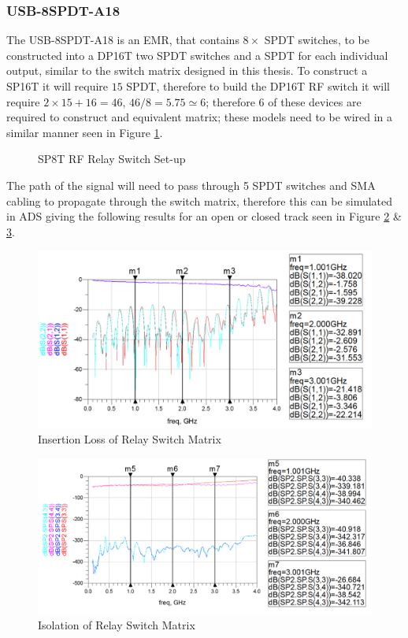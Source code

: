 \documentclass[12pt,openany,a4paper]{book}
\begin{document}
\subsubsection{USB-8SPDT-A18}
The USB-8SPDT-A18 is an EMR, that contains $8\times$ SPDT switches, to be constructed into a DP16T two SPDT switches and a SPDT for each individual output, similar to the switch matrix designed in this thesis. To construct a SP16T it will require $15$ SPDT, therefore to build the DP16T RF switch it will require $2\times 15 + 16=46$, $46/8=5.75 \simeq 6$; therefore 6 of these devices are required to construct and equivalent matrix; these models need to be wired in a similar manner seen in Figure \ref{fig:relay-switchmatrix}.
\begin{figure}[H]
	\centering
	\caption{SP8T RF Relay Switch Set-up}
	\label{fig:relay-switchmatrix}
\end{figure}
The path of the signal will need to pass through 5 SPDT switches and SMA cabling to propagate through the switch matrix, therefore this can be simulated in ADS giving the following results for an open or closed track seen in Figure \ref{fig:insertion-relay-switchmatrix} \& \ref{fig:isolation-relay-switchmatrix}.
\begin{figure}[H]
	\centering
    \includegraphics[width=1\textwidth]{relay-switch-open.png}
	\caption{Insertion Loss of Relay Switch Matrix}
	\label{fig:insertion-relay-switchmatrix}
\end{figure} 
\begin{figure}[H]
	\centering
    \includegraphics[width=1\textwidth]{relay-switch-closed.png}
	\caption{Isolation of Relay Switch Matrix}
	\label{fig:isolation-relay-switchmatrix}
\end{figure} 
\end{document}
